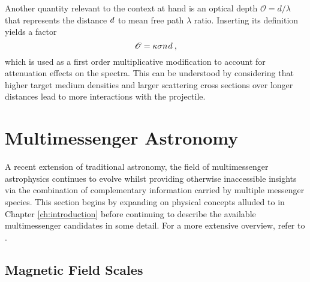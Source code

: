 \begin{spacing}{0.985}
	Another quantity relevant to the context at hand is an optical depth $\mathscr{O} = d / \lambda$ that represents the distance
	$d \kern+0.5pt$ to mean free path $\lambda$ ratio. Inserting its definition yields a factor
	\begin{equation}
		\mathscr{O} = \kappa\sigma n \kern+0.75pt d \: ,
		\label{eqn:optical}
	\end{equation}
	which is used as a first order multiplicative modification to account for attenuation effects on the spectra. This can be understood
	by considering that higher target medium densities and larger scattering cross sections over longer distances lead to more interactions
	with the projectile. 
	
	
	
	\section{Multimessenger Astronomy}
	\label{sec:multimessenger}
	
	A recent extension of traditional astronomy, the field of multimessenger astrophysics continues to evolve whilst providing otherwise
	inaccessible insights via the combination of complementary information carried by multiple messenger species. This section begins by
	expanding on physical concepts alluded to in Chapter \ref{ch:introduction} before continuing to describe the available multimessenger
	candidates in some detail. For a more extensive overview, refer to \cite{Meszaros_2019}.
	
	
	
	\subsection{Magnetic Field Scales}
	\label{sub:fields}
	

\end{spacing}

